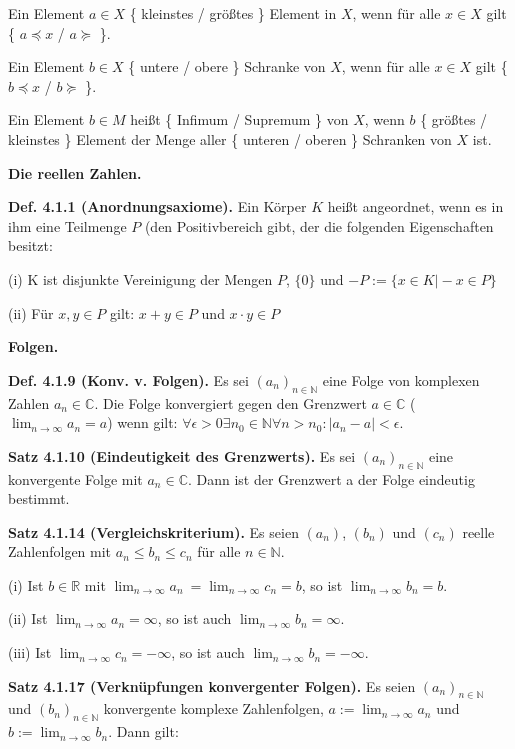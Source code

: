 \documentclass[ngerman]{article}
\begin{document}
\begin{multicols}{4}
\begin{tiny}
Ein Element $a \in X$ \{ kleinstes / größtes \} Element in $X$, wenn für alle $x \in X$ gilt \{ $a \preceq x$ / $a \succeq$ \}.

Ein Element $b \in X$ \{ untere / obere \} Schranke von $X$, wenn für alle $x \in X$ gilt \{ $b \preceq x$ / $b \succeq$ \}.

Ein Element $ b \in M$ heißt \{ Infimum / Supremum \} von $X$, wenn $b$ \{ größtes / kleinstes \} Element der Menge aller \{ unteren / oberen \} Schranken von $X$ ist.

\textbf{Die reellen Zahlen.}

\textbf{Def. 4.1.1 (Anordnungsaxiome).} Ein Körper $K$ heißt angeordnet, wenn es in ihm eine Teilmenge $P$ (den Positivbereich gibt, der die folgenden Eigenschaften besitzt:

(i) K ist disjunkte Vereinigung der Mengen $P$, $\{ 0 \}$ und $-P := \{ x \in K \vert -x \in P \}$

(ii) Für $x,y \in P$ gilt: $x + y \in P$ und $x \cdot y \in P$

\textbf{Folgen.}

\textbf{Def. 4.1.9 (Konv. v. Folgen).} Es sei $(a_n)_{n \in \mathbb N}$ eine Folge von komplexen Zahlen $a_n \in \mathbb C$. Die Folge konvergiert gegen den Grenzwert $a \in \mathbb C$ ($\lim_{n \rightarrow \infty} a_n = a$) wenn gilt: $\forall \epsilon > 0 \exists n_0 \in \mathbb N \forall n > n_0 : \vert a_n - a \vert < \epsilon$. 

\textbf{Satz 4.1.10 (Eindeutigkeit des Grenzwerts).} Es sei $(a_n)_{n \in \mathbb N}$ eine konvergente Folge mit $a_n \in \mathbb{C}$. Dann ist der Grenzwert a der Folge eindeutig bestimmt.

\textbf{Satz 4.1.14 (Vergleichskriterium).} Es seien $(a_n)$, $(b_n)$ und $(c_n)$ reelle Zahlenfolgen mit $a_n \leq b_n \leq c_n$ für alle $n \in \mathbb N$.

(i) Ist $b \in \mathbb R$ mit $\lim_{n \rightarrow \infty} a_n\ = \lim_{n \rightarrow \infty} c_n = b$, so ist $\lim_{n \rightarrow \infty} b_n = b$.

(ii) Ist $\lim_{n \rightarrow \infty} a_n = \infty$, so ist auch $\lim_{n \rightarrow \infty} b_n = \infty$.

(iii) Ist $\lim_{n \rightarrow \infty} c_n = -\infty$, so ist auch $\lim_{n \rightarrow \infty} b_n = -\infty$.

\textbf{Satz 4.1.17 (Verknüpfungen konvergenter Folgen).} Es seien $(a_n)_{n\in \mathbb N}$ und $(b_n)_{n \in \mathbb N}$ konvergente komplexe Zahlenfolgen, $a := \lim_{n \rightarrow \infty} a_n$ und $b := \lim_{n \rightarrow \infty} b_n$. Dann gilt:


\end{tiny}
\end{multicols}
\end{document}
